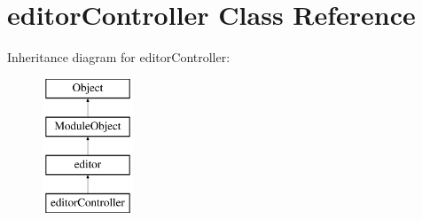 \hypertarget{classeditorController}{\section{editor\-Controller Class Reference}
\label{classeditorController}
}
Inheritance diagram for editor\-Controller\-:\begin{figure}[H]
\begin{center}
\leavevmode
\includegraphics[height=4.000000cm]{classeditorController}
\end{center}
\end{figure}

